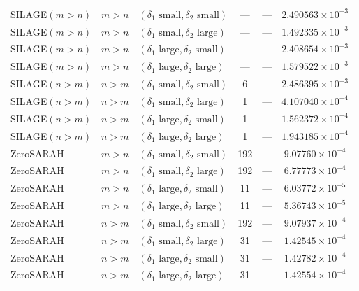 \documentclass{article}
\theoremstyle{plain}
\newcommand{\algname}[1]{{\sf\scalefont{0.88}\color{mydarkgreen}#1}\xspace}
\def\algname#1{#1}%
\begin{document}
\begin{longtable}{lllccc}
\algname{SILAGE}$(m>n)$ & $m>n$ & $(\delta_1 \text{ small}, \delta_2 \text{ small})$ & --- & --- & $2.490563 \times 10^{-3}$ \\
\algname{SILAGE}$(m>n)$ & $m>n$ & $(\delta_1 \text{ small}, \delta_2 \text{ large})$ & --- & --- & $1.492335 \times 10^{-3}$ \\
\algname{SILAGE}$(m>n)$ & $m>n$ & $(\delta_1 \text{ large}, \delta_2 \text{ small})$ & --- & --- & $2.408654 \times 10^{-3}$ \\
\algname{SILAGE}$(m>n)$ & $m>n$ & $(\delta_1 \text{ large}, \delta_2 \text{ large})$ & --- & --- & $1.579522 \times 10^{-3}$ \\
\midrule
\algname{SILAGE}$(n>m)$ & $n>m$ & $(\delta_1 \text{ small}, \delta_2 \text{ small})$ & 6 & --- & $2.486395 \times 10^{-3}$ \\
\algname{SILAGE}$(n>m)$ & $n>m$ & $(\delta_1 \text{ small}, \delta_2 \text{ large})$ & 1 & --- & $4.107040 \times 10^{-4}$ \\
\algname{SILAGE}$(n>m)$ & $n>m$ & $(\delta_1 \text{ large}, \delta_2 \text{ small})$ & 1 & --- & $1.562372 \times 10^{-4}$ \\
\algname{SILAGE}$(n>m)$ & $n>m$ & $(\delta_1 \text{ large}, \delta_2 \text{ large})$ & 1 & --- & $1.943185 \times 10^{-4}$ \\
\midrule
\algname{ZeroSARAH} & $m>n$ & $(\delta_1 \text{ small}, \delta_2 \text{ small})$ & 192 & --- & $9.07760 \times 10^{-4}$ \\
\algname{ZeroSARAH} & $m>n$ & $(\delta_1 \text{ small}, \delta_2 \text{ large})$ & 192 & --- & $6.77773 \times 10^{-4}$ \\
\algname{ZeroSARAH} & $m>n$ & $(\delta_1 \text{ large}, \delta_2 \text{ small})$ & 11  & --- & $6.03772 \times 10^{-5}$ \\
\algname{ZeroSARAH} & $m>n$ & $(\delta_1 \text{ large}, \delta_2 \text{ large})$ & 11  & --- & $5.36743 \times 10^{-5}$ \\
\algname{ZeroSARAH} & $n>m$ & $(\delta_1 \text{ small}, \delta_2 \text{ small})$ & 192 & --- & $9.07937 \times 10^{-4}$ \\
\algname{ZeroSARAH} & $n>m$ & $(\delta_1 \text{ small}, \delta_2 \text{ large})$ & 31  & --- & $1.42545 \times 10^{-4}$ \\
\algname{ZeroSARAH} & $n>m$ & $(\delta_1 \text{ large}, \delta_2 \text{ small})$ & 31  & --- & $1.42782 \times 10^{-4}$ \\
\algname{ZeroSARAH} & $n>m$ & $(\delta_1 \text{ large}, \delta_2 \text{ large})$ & 31  & --- & $1.42554 \times 10^{-4}$ \\

\end{longtable}
\end{document}
